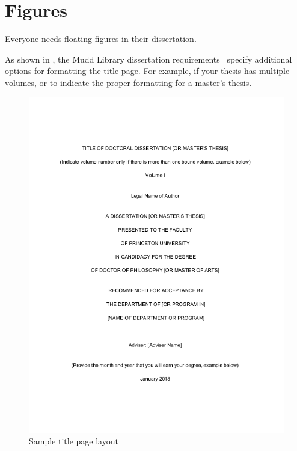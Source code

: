 \section{Figures}
\label{sec:pastwork:figures}

Everyone needs floating figures in their dissertation.

As shown in , the Mudd Library dissertation requirements~\cite{muddthesis2019} specify additional options for formatting the title page. For example, if your thesis has multiple volumes, or to indicate the proper formatting for a master's thesis.

\begin{figure}[htb]
  \begin{center}
    \includegraphics[width=0.9\linewidth]{ch-pastwork/figures/titlepage}
    \caption[Sample Title Page Layout]{Sample title page layout~\cite{muddthesis2019}}
    \label{fig:pastwork:titlepage}
  \end{center}
\end{figure}
